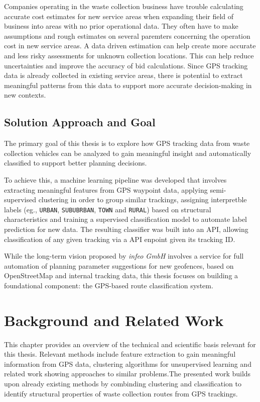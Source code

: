 \documentclass[a4paper,12pt,twoside]{scrreprt}
\begin{document}
Companies operating in the waste collection business have trouble calculating
accurate cost estimates for new service areas when expanding their field of
business into
areas with no prior operational data.
They
often have to make assumptions and rough estimates on several paremters
concerning the operation cost in new service areas. A data driven estimation
can help create more accurate and less risky assessments for unknown collection
locations. This can help reduce uncertainties and improve the accuracy of bid
calculations.
Since GPS tracking data is already collected in existing service
areas, there is potential to extract meaningful patterns from this data to
support more accurate decision-making in new contexts.

\section{Solution Approach and Goal}

The primary goal of this thesis is to explore how GPS tracking data from waste
collection vehicles can be analyzed to gain meaningful insight and
automatically classified to support better planning decisions.

To achieve this, a machine learning pipeline was developed that
involves extracting meaningful features from GPS waypoint data, applying
semi-supervised clustering in order to group similar trackings, assigning
interpretble labels (eg., \texttt{URBAN}, \texttt{SUBUBRBAN}, \texttt{TOWN} and
\texttt{RURAL}) based on structural characteristics and training a supervised
classification model to automate label prediction for new data.
The resulting classifier was built into an API, allowing classification of any
given tracking via a API enpoint given its tracking ID.

While the long-term vision proposed by \textit{infeo GmbH} involves a service
for full automation of planning parameter suggestions for new geofences, based
on OpenStreetMap and internal tracking data, this thesis focuses on building a
foundational component: the GPS-based route classification system.

\chapter{Background and Related Work}
This chapter provides an overview of the technical and scientific basis
relevant for this thesis.
Relevant methods include feature extraction to gain meaningful information
from GPS data, clustering algorithms for unsupervised learning and related work
showing approaches to similar problems.The presented work builds upon already
existing methods by combinding
clustering and classification to identify structural properties of waste
collection routes from GPS trackings.
\end{document}
